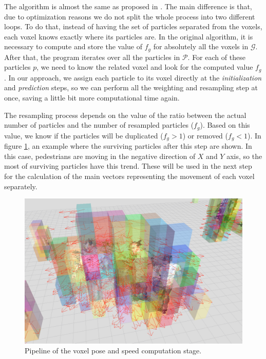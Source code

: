 The algorithm is almost the same as proposed in \cite{danescu2012particle}. The main difference is that, due to optimization reasons we do not split the whole process into two different loops. To do that, instead of having the set of particles separated from the voxels, each voxel knows exactly where its particles are. In the original algorithm, it is necessary to compute and store the value of $f_g$ for absolutely all the voxels in $\mathcal{G}$. After that, the program iterates over all the particles in $\mathcal{P}$. For each of these particles $p$, we need to know the related voxel and look for the computed value $f_g$. In our approach, we assign each particle to its voxel directly at the \emph{initialization} and \emph{prediction} steps, so we can perform all the weighting and resampling step at once, saving a little bit more computational time again.

The resampling process depends on the value of the ratio between the actual number of particles and the number of resampled particles ($f_g$). Based on this value, we know if the particles will be duplicated ($f_g > 1$) or removed ($f_g < 1$). In figure \ref{fig:cp05_weight_and_resample}, an example where the surviving particles after this step are shown. In this case, pedestrians are moving in the negative direction of $X$ and $Y$ axis, so the most of surviving particles have this trend. These will be used in the next step for the calculation of the main vectors representing the movement of each voxel separately.

\begin{figure}[th]
  \centering
  \includegraphics{weightAndResample}
  \caption{Pipeline of the voxel pose and speed computation stage.}\label{fig:cp05_weight_and_resample}
\end{figure}

